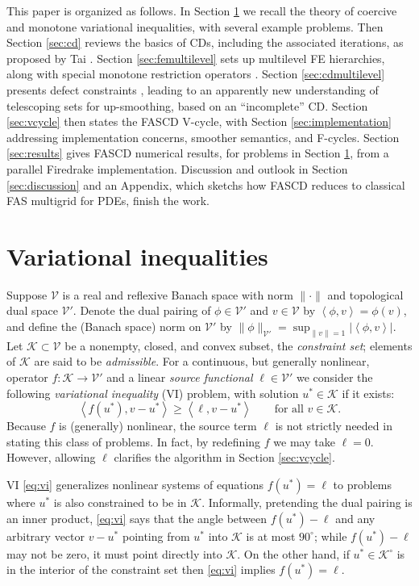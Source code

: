 \documentclass[letterpaper,final,12pt,reqno]{amsart}
\theoremstyle{cstyle}
\theoremstyle{cstyle*}
\theoremstyle{dstyle}
\numberwithin{equation}{section}
\numberwithin{figure}{section}
\numberwithin{table}{section}
\numberwithin{theorem}{section}
\newcommand{\cK}{\mathcal{K}}
\newcommand{\cV}{\mathcal{V}}
\newcommand{\ip}[2]{\left<#1,#2\right>}
\begin{document}
This paper is organized as follows.  In Section \ref{sec:vi} we recall the theory of coercive and monotone variational inequalities, with several example problems.  Then Section \ref{sec:cd} reviews the basics of CDs, including the associated iterations, as proposed by Tai \cite{Tai2003}.  Section \ref{sec:femultilevel} sets up multilevel FE hierarchies, along with special monotone restriction operators \cite{GraeserKornhuber2009}.  Section \ref{sec:cdmultilevel} presents defect constraints \cite{GraeserKornhuber2009}, leading to an apparently new understanding of telescoping sets for up-smoothing, based on an ``incomplete'' CD.  Section \ref{sec:vcycle} then states the FASCD V-cycle, with Section \ref{sec:implementation} addressing implementation concerns, smoother semantics, and F-cycles.  Section \ref{sec:results} gives FASCD numerical results, for problems in Section \ref{sec:vi}, from a parallel Firedrake \cite{Rathgeberetal2016} implementation.  Discussion and outlook in Section \ref{sec:discussion} and an Appendix, which sketchs how FASCD reduces to classical FAS multigrid for PDEs, finish the work.


\section{Variational inequalities} \label{sec:vi}

Suppose $\cV$ is a real and reflexive Banach space with norm $\|\cdot\|$ and topological dual space $\cV'$.  Denote the dual pairing of $\phi \in \cV'$ and $v\in\cV$ by $\ip{\phi}{v} = \phi(v)$, and define the (Banach space) norm on $\cV'$ by $\|\phi\|_{\cV'} = \sup_{\|v\|=1} |\ip{\phi}{v}|$.  Let $\cK \subset \cV$ be a nonempty, closed, and convex subset, the \emph{constraint set}; elements of $\cK$ are said to be \emph{admissible}.  For a continuous, but generally nonlinear, operator $f:\cK \to \cV'$ and a linear \emph{source functional} $\ell\in \cV'$ we consider the following \emph{variational inequality} (VI) problem, with solution $u^*\in \cK$ if it exists:
\begin{equation}
\ip{f(u^*)}{v-u^*} \ge \ip{\ell}{v-u^*} \qquad \text{for all } v\in \cK. \label{eq:vi}
\end{equation}
Because $f$ is (generally) nonlinear, the source term $\ell$ is not strictly needed in stating this class of problems.  In fact, by redefining $f$ we may take $\ell=0$.  However, allowing $\ell$ clarifies the algorithm in Section \ref{sec:vcycle}.

VI \eqref{eq:vi} generalizes nonlinear systems of equations $f(u^*)=\ell$ to problems where $u^*$ is also constrained to be in $\cK$.  Informally, pretending the dual pairing is an inner product, \eqref{eq:vi} says that the angle between $f(u^*)-\ell$ and any arbitrary vector $v-u^*$ pointing from $u^*$ into $\cK$ is at most $90^\circ$; while $f(u^*)-\ell$ may not be zero, it must point directly into $\cK$.  On the other hand, if $u^*\in\cK^\circ$ is in the interior of the constraint set then \eqref{eq:vi} implies $f(u^*)=\ell$.
\end{document}
